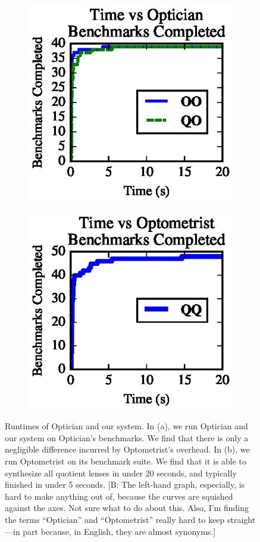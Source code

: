 \documentclass[acmsmall,review,anonymous]{acmart}
\newcommand{\FINISH}[3]{\ifdraft\textcolor{#1}{[#2: #3]}\fi}
\newcommand{\bcp}[1]{\FINISH{dkred}{B}{#1}}
\begin{document}
\begin{figure}[t]
\centering
\begin{subfigure}[b]{.49\textwidth}
\centering
\includegraphics{generated-graphs/times_opt}
\caption{}
\label{subfig:lenssize}
\end{subfigure}
\begin{subfigure}[b]{.49\textwidth}
\includegraphics{generated-graphs/times_new.eps}
\caption{}
\label{subfig:examplesused}
\end{subfigure}
\caption{Runtimes of Optician and our system.
In (a), we run Optician and our system on Optician's benchmarks.  We find that
there is only a negligible difference incurred by Optometrist's overhead.
In (b), we run Optometrist on its benchmark suite.  We find that it is able
to synthesize all quotient lenses in under 20 seconds, and typically
finished in under 5 seconds. \bcp{The left-hand graph, especially, is hard
  to make anything out of, because the curves are squished against the
  axes.  Not sure what to do about this.  Also, I'm finding the terms
  ``Optician'' and ``Optometrist'' really hard to keep straight---in part
  because, in English, they are almost synonyms.}}
\label{fig:times}
\end{figure}
\end{document}
